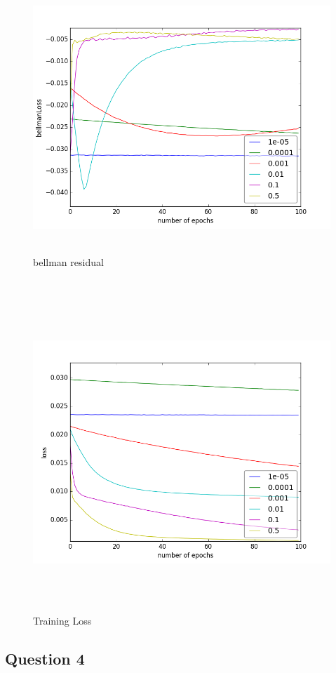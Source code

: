 \documentclass{report}
\begin{document}
\begin{figure}[H]
    \begin{minipage}[c]{.46\linewidth}
        \centering
        \includegraphics[width = 0.7\linewidth]{plots/a3-2/bellmanLoss.png}
        \caption{bellman residual}
    \end{minipage}
    \hfill%
    \begin{minipage}[c]{.46\linewidth}
        \centering
        \includegraphics[width = 0.7\linewidth]{plots/a3-2/loss.png}
        \caption{Training Loss}
    \end{minipage}
\end{figure}

\subsection*{Question 4}
\end{document}
